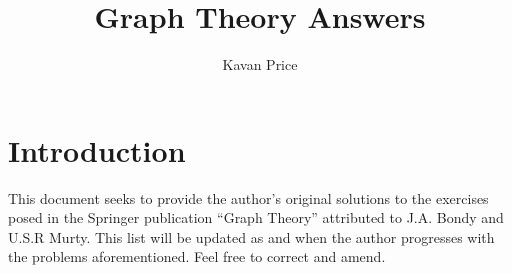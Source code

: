 \documentclass[11pt,a4paper,twoside]{article}
\title{\textbf{Graph Theory Answers}}
\author{Kavan Price}
\date{}
\begin{document}
\maketitle

\section*{Introduction}
This document seeks to provide the author's original solutions to the exercises posed in the Springer publication ``Graph Theory'' attributed to J.A. Bondy and U.S.R Murty. This list will be updated as and when the author progresses with the problems aforementioned. Feel free to correct and amend.
\newpage
\end{document}
